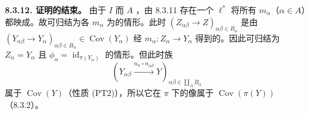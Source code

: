 \textbf{8.3.12. 证明的结束。} 由于 $I$ 而 $A$ ，由 8.3.11 存在一个 $\ell^*$ 将所有 $m_\alpha$（$\alpha\in A$）都映成。故可归结为各 $m_\alpha$ 为的情形。此时 $(Z_{\alpha\beta}\to Z)_{\alpha\beta\in B_\alpha}$ 是由 $(Y_{\alpha\beta}\to Y_\alpha)_{\alpha\beta\in B_\alpha}\in\operatorname{Cov}(Y_\alpha)$ 经 $m_\alpha:Z_\alpha\to Y_\alpha$ 得到的。因此可归结为 $Z_\alpha=Y_\alpha$ 且 $\phi_\alpha=\operatorname{id}_{\pi(Y_\alpha)}$ 的情形。但此时族
\[\left(Y_{\alpha\beta}\xrightarrow{n_\alpha\circ n_{\alpha\beta}}Y\right)_{\alpha\beta\in\coprod_A B_\alpha}\]
属于 $\operatorname{Cov}(Y)$（性质 (PT2)），所以它在 $\pi$ 下的像属于 $\operatorname{Cov}(\pi(Y))$（8.3.2）。

